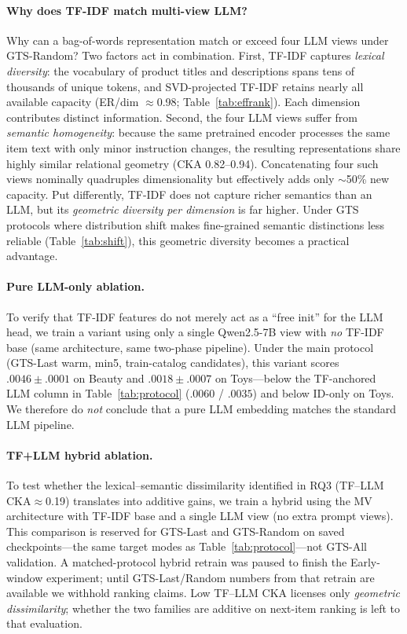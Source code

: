\documentclass[sigconf,natbib=true,anonymous]{acmart}
\newcommand{\tfidf}{\textsc{TF-IDF}\xspace}
\begin{document}
\paragraph{Why does TF-IDF match multi-view LLM?}
Why can a bag-of-words representation match or exceed four LLM views under GTS-Random?
Two factors act in combination.
First, \tfidf captures \emph{lexical diversity}: the vocabulary of product titles and descriptions spans tens of thousands of unique tokens, and SVD-projected TF-IDF retains nearly all available capacity (ER/dim $\approx$0.98; Table~\ref{tab:effrank}).
Each dimension contributes distinct information.
Second, the four LLM views suffer from \emph{semantic homogeneity}: because the same pretrained encoder processes the same item text with only minor instruction changes, the resulting representations share highly similar relational geometry (CKA 0.82--0.94).
Concatenating four such views nominally quadruples dimensionality but effectively adds only $\sim$50\% new capacity.
Put differently, TF-IDF does not capture richer semantics than an LLM, but its \emph{geometric diversity per dimension} is far higher.
Under GTS protocols where distribution shift makes fine-grained semantic distinctions less reliable (Table~\ref{tab:shift}), this geometric diversity becomes a practical advantage.

\paragraph{Pure LLM-only ablation.}
To verify that TF-IDF features do not merely act as a ``free init'' for the LLM head, we train a variant using only a single Qwen2.5-7B view with \emph{no} TF-IDF base (same architecture, same two-phase pipeline).
Under the main protocol (GTS-Last warm, min5, train-catalog candidates), this variant scores $.0046\pm.0001$ on Beauty and $.0018\pm.0007$ on Toys---below the TF-anchored LLM column in Table~\ref{tab:protocol} ($.0060$ / $.0035$) and below ID-only on Toys.
We therefore do \emph{not} conclude that a pure LLM embedding matches the standard LLM pipeline.

\paragraph{TF+LLM hybrid ablation.}
To test whether the lexical--semantic dissimilarity identified in RQ3 (TF--LLM CKA$\approx$0.19) translates into additive gains, we train a hybrid using the MV architecture with \tfidf base and a single LLM view (no extra prompt views).
This comparison is reserved for GTS-Last and GTS-Random on saved checkpoints---the same target modes as Table~\ref{tab:protocol}---not GTS-All validation.
A matched-protocol hybrid retrain was paused to finish the Early-window experiment; until GTS-Last/Random numbers from that retrain are available we withhold ranking claims.
Low TF--LLM CKA licenses only \emph{geometric dissimilarity}; whether the two families are additive on next-item ranking is left to that evaluation.
\end{document}
